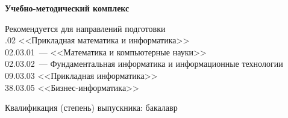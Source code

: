 

\cleardoublepage
{}
\thispagestyle{plain}
\vspace*{3cm}

\begin{center}
\textbf{\huge{Учебно-методический комплекс %
  }}
\end{center}

\bigskip
\bigskip
\bigskip



\begin{center}
  Рекомендуется для направлений подготовки\\
.02 <<Прикладная математика и информатика>>%
\\ 02.03.01~--- <<Математика и компьютерные науки>>
  \\ 02.03.02~---
  Фундаментальная информатика и информационные технологии%
\\ 09.03.03 <<Прикладная информатика>>
\\ 38.03.05 <<Бизнес-информатика>>
\end{center}

\bigskip

\begin{center}
Квалификация (степень) выпускника: бакалавр
\end{center}


\vspace*{\fill}

\clearpage
\thispagestyle{plain}
\hbox{}
\clearpage

